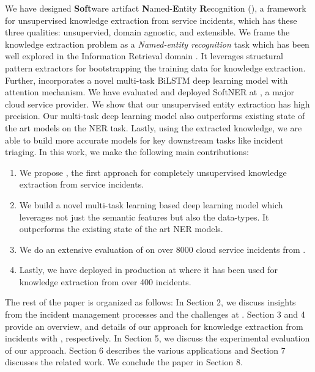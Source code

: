 We have designed \textbf{Soft}ware artifact \textbf{N}amed-\textbf{E}ntity \textbf{R}ecognition (\softner{}), a framework for unsupervised knowledge extraction from service incidents, which has these three qualities: unsupervied, domain agnostic, and extensible. We frame the knowledge extraction problem as a \textit{Named-entity recognition} task which has been well explored in the Information Retrieval domain \cite{nadeau2007survey, lample2016neural}. It leverages structural pattern extractors for bootstrapping the training data for knowledge extraction. Further, \softner{} incorporates a novel multi-task BiLSTM deep learning model with attention mechanism. We have evaluated and deployed SoftNER at \CompanyX{}, a major cloud service provider. We show that our unsupervised entity extraction has high precision. Our multi-task deep learning model also outperforms existing state of the art models on the NER task. Lastly, using the extracted knowledge, we are able to build more accurate models for key downstream tasks like incident triaging. In this work, we make the following main contributions:
\begin{enumerate}
    \item We propose \softner{}, the first approach for completely unsupervised knowledge extraction from service incidents.
    \item We build a novel multi-task learning based deep learning model which leverages not just the semantic features but also the data-types. It outperforms the existing state of the art NER models. 
    \item We do an extensive evaluation of \softner{} on over 8000 cloud service incidents from \CompanyX{}.
    \item Lastly, we have deployed \softner{} in production at \CompanyX{} where it has been used for knowledge extraction from over 400 incidents.
\end{enumerate}

The rest of the paper is organized as follows: In Section 2, we discuss insights from the incident management processes and the challenges at \CompanyX{}. Section 3 and 4 provide an overview, and details of our approach for knowledge extraction from incidents with \softner{}, respectively. In Section 5, we discuss the experimental evaluation of our approach. Section 6 describes the various applications and Section 7 discusses the related work. We conclude the paper in Section 8.